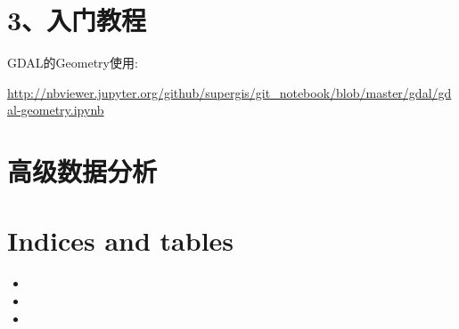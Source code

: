 \documentclass[letterpaper,10pt,english]{sphinxmanual}
\begin{document}
\chapter{3、入门教程}
\label{index:id3}
GDAL的Geometry使用:

\url{http://nbviewer.jupyter.org/github/supergis/git\_notebook/blob/master/gdal/gdal-geometry.ipynb}


\chapter{高级数据分析}
\label{index:id4}

\chapter{Indices and tables}
\label{index:indices-and-tables}\begin{itemize}
\item {} 

\item {} 

\item {} 

\end{itemize}



\renewcommand{\indexname}{索引}
\printindex
\end{document}
